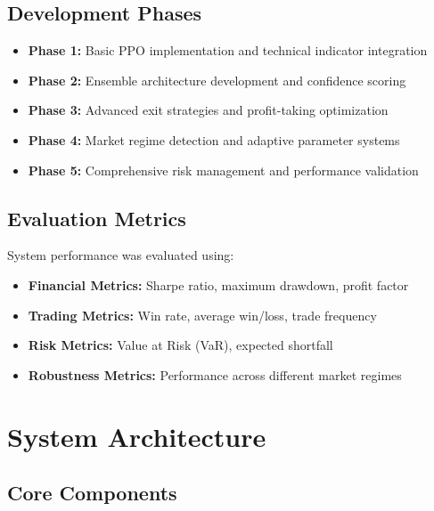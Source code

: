\documentclass[11pt,a4paper]{article}
\begin{document}
\subsection{Development Phases}

\begin{itemize}
    \item \textbf{Phase 1:} Basic PPO implementation and technical indicator integration
    \item \textbf{Phase 2:} Ensemble architecture development and confidence scoring
    \item \textbf{Phase 3:} Advanced exit strategies and profit-taking optimization
    \item \textbf{Phase 4:} Market regime detection and adaptive parameter systems
    \item \textbf{Phase 5:} Comprehensive risk management and performance validation
\end{itemize}

\subsection{Evaluation Metrics}

System performance was evaluated using:

\begin{itemize}
    \item \textbf{Financial Metrics:} Sharpe ratio, maximum drawdown, profit factor
    \item \textbf{Trading Metrics:} Win rate, average win/loss, trade frequency
    \item \textbf{Risk Metrics:} Value at Risk (VaR), expected shortfall
    \item \textbf{Robustness Metrics:} Performance across different market regimes
\end{itemize}

\section{System Architecture}

\subsection{Core Components}
\end{document}
